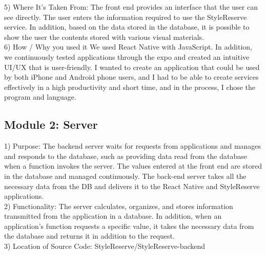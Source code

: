 \documentclass[conference]{IEEEtran}
\begin{document}
5) Where It’s Taken From: The front end provides an interface that the user can see directly. The user enters the information required to use the StyleReserve service. In addition, based on the data stored in the database, it is possible to show the user the contents stored with various visual materials.\\

6) How / Why you used it
We used React Native with JavaScript. In addition, we continuously tested applications through the expo and created an intuitive UI/UX that is user-friendly. I wanted to create an application that could be used by both iPhone and Android phone users, and I had to be able to create services effectively in a high productivity and short time, and in the process, I chose the program and language.\\

\subsection{Module 2: Server}
1) Purpose: The backend server waits for requests from applications and manages and responds to the database, such as providing data read from the database when a function invokes the server. The values entered at the front end are stored in the database and managed continuously. The back-end server takes all the necessary data from the DB and delivers it to the React Native and StyleReserve applications.\\

2) Functionality: The server calculates, organizes, and stores information transmitted from the application in a database. In addition, when an application's function requests a specific value, it takes the necessary data from the database and returns it in addition to the request.\\

3) Location of Source Code: StyleReserve/StyleReserve-backend\\
\end{document}
